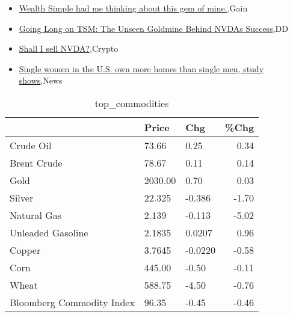 \documentclass{article}%
\begin{document}
%
\begin{itemize}%
\item%
\href{https://reddit.com/r/wallstreetbets/comments/19crhtr/wealth\_simple\_had\_me\_thinking\_about\_this\_gem\_of/}{Wealth Simple had me thinking about this gem of mine.},Gain%
\item%
\href{https://reddit.com/r/wallstreetbets/comments/19cpyw1/going\_long\_on\_tsm\_the\_unseen\_goldmine\_behind/}{Going Long on TSM: The Unseen Goldmine Behind NVDAs Success},DD%
\item%
\href{https://reddit.com/r/StockMarket/comments/19cjoq5/shall\_i\_sell\_nvda/}{Shall I sell NVDA?},Crypto%
\item%
\href{https://reddit.com/r/Economics/comments/19cote3/single\_women\_in\_the\_us\_own\_more\_homes\_than\_single/}{Single women in the U.S. own more homes than single men, study shows},News%
\end{itemize}%


\begin{table}[htbp]%
\caption{top\_commodities}%
\centering%
\begin{adjustbox}{width=1\textwidth}%
\begin{tabular}{lllr}
\toprule
                          &   Price &     Chg &  \%Chg \\
\midrule
               Crude Oil  &   73.66 &    0.25 &  0.34 \\
             Brent Crude  &   78.67 &    0.11 &  0.14 \\
                    Gold  & 2030.00 &    0.70 &  0.03 \\
                  Silver  &  22.325 &  -0.386 & -1.70 \\
             Natural Gas  &   2.139 &  -0.113 & -5.02 \\
       Unleaded Gasoline  &  2.1835 &  0.0207 &  0.96 \\
                  Copper  &  3.7645 & -0.0220 & -0.58 \\
                    Corn  &  445.00 &   -0.50 & -0.11 \\
                   Wheat  &  588.75 &   -4.50 & -0.76 \\
Bloomberg Commodity Index &   96.35 &   -0.45 & -0.46 \\
\bottomrule
\end{tabular}
%
\end{adjustbox}%
\end{table}

%
\end{document}
